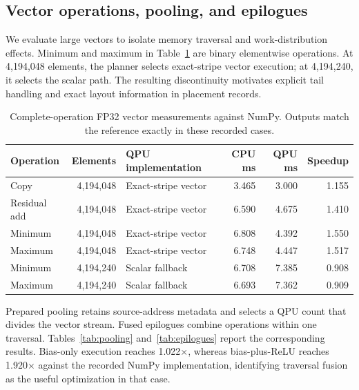 \documentclass[sigplan,screen,review]{acmart}
\begin{document}
\subsection{Vector operations, pooling, and epilogues}

We evaluate large vectors to isolate memory traversal and work-distribution effects. Minimum and maximum in Table~\ref{tab:vector-results} are binary elementwise operations. At 4,194,048 elements, the planner selects exact-stripe vector execution; at 4,194,240, it selects the scalar path. The resulting discontinuity motivates explicit tail handling and exact layout information in placement records.

\begin{table}[t]
\centering
\caption{Complete-operation FP32 vector measurements against NumPy. Outputs match the reference exactly in these recorded cases.}
\label{tab:vector-results}
\small
\begin{tabular}{@{}lrlrrr@{}}
\toprule
Operation & Elements & QPU implementation & CPU ms & QPU ms & Speedup \\
\midrule
Copy & 4,194,048 & Exact-stripe vector & 3.465 & 3.000 & 1.155 \\
Residual add & 4,194,048 & Exact-stripe vector & 6.590 & 4.675 & 1.410 \\
Minimum & 4,194,048 & Exact-stripe vector & 6.808 & 4.392 & 1.550 \\
Maximum & 4,194,048 & Exact-stripe vector & 6.748 & 4.447 & 1.517 \\
Minimum & 4,194,240 & Scalar fallback & 6.708 & 7.385 & 0.908 \\
Maximum & 4,194,240 & Scalar fallback & 6.693 & 7.362 & 0.909 \\
\bottomrule
\end{tabular}
\end{table}

Prepared pooling retains source-address metadata and selects a QPU count that divides the vector stream. Fused epilogues combine operations within one traversal. Tables~\ref{tab:pooling} and~\ref{tab:epilogues} report the corresponding results. Bias-only execution reaches 1.022$\times$, whereas bias-plus-ReLU reaches 1.920$\times$ against the recorded NumPy implementation, identifying traversal fusion as the useful optimization in that case.
\end{document}
